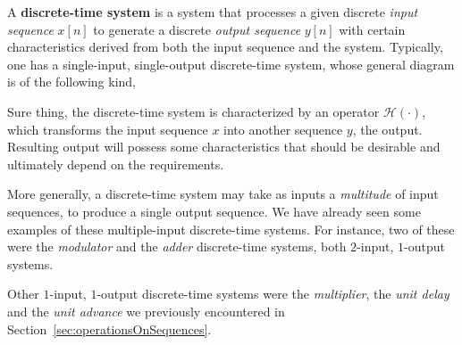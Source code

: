 \documentclass[\documentfontsize, twocolumn]{\classname}
\begin{document}
A \textbf{discrete-time system} is a system that processes a given discrete \emph{input sequence} $x[n]$ to generate a discrete \emph{output sequence} $y[n]$ with certain characteristics derived from both the input sequence and the system. Typically, one has a single-input, single-output discrete-time system, whose general diagram is of the following kind,
\begin{center}
\end{center}
Sure thing, the discrete-time system is characterized by an operator $\mathcal H(\cdot)$, which transforms the input sequence $x$ into another sequence $y$, the output. Resulting output will possess some characteristics that should be desirable and ultimately depend on the requirements.

More generally, a discrete-time system may take as inputs a \emph{multitude} of input sequences, to produce a single output sequence. We have already seen some examples of these multiple-input discrete-time systems. For instance, two of these were the \emph{modulator} and the \emph{adder} discrete-time systems, both $2$-input, $1$-output systems.
\begin{center}
\end{center}
Other $1$-input, $1$-output discrete-time systems were the \emph{multiplier}, the \emph{unit delay} and the \emph{unit advance} we previously encountered in Section~\ref{sec:operationsOnSequences}.
\end{document}
